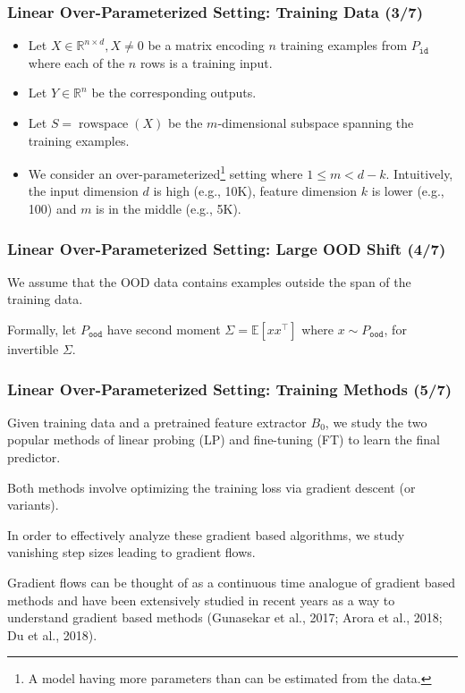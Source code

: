 \documentclass[16pt,aspectratio=169]{beamer}
\begin{document}
\begin{frame}
    \frametitle{Linear Over-Parameterized Setting: Training Data (3/7)}

    \begin{itemize}
        \item Let $X \in \mathbb{R}^{n \times d}, X \neq 0$ be a matrix encoding $n$ training examples from $P_{\mathtt {id}}$ where each of the $n$ rows is a training input. 
        \item Let $Y \in \mathbb{R}^n$ be the corresponding outputs. 
        \item Let $S=\operatorname{rowspace}(X)$ be the $m$-dimensional subspace spanning the training examples.
        \item We consider an over-parameterized\footnote{A model having more parameters than can be estimated from the data.} setting where $1 \leq m<d-k$. Intuitively, the input dimension $d$ is high (e.g., 10K), feature dimension $k$ is lower (e.g., 100) and $m$ is in the middle (e.g., 5K).
    \end{itemize}

\end{frame}

\begin{frame}
    \frametitle{Linear Over-Parameterized Setting: Large OOD Shift (4/7)}

    We assume that the OOD data contains examples outside the span of the training data.

    Formally, let $P_{\mathtt {ood}}$ have second moment $\Sigma=\mathbb{E}\left[x x^{\top}\right]$ where $x \sim P_{\mathtt {ood}}$, for invertible $\Sigma$.

\end{frame}

\begin{frame}
    \frametitle{Linear Over-Parameterized Setting: Training Methods (5/7)}

    Given training data and a pretrained feature extractor $B_0$, we study the two popular methods of linear probing (LP) and fine-tuning (FT) to learn the final predictor.

    Both methods involve optimizing the training loss via gradient descent (or variants).

    In order to effectively analyze these gradient based algorithms, we study vanishing step sizes leading to gradient flows.

    Gradient flows can be thought of as a continuous time analogue of gradient based methods and have been extensively studied in recent years as a way to understand gradient based methods (Gunasekar et al., 2017; Arora et al., 2018; Du et al., 2018).

\end{frame}
\end{document}
